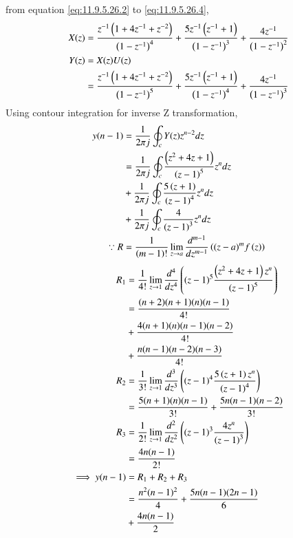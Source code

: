 \documentclass[journal,12pt,twocolumn]{IEEEtran}
\theoremstyle{remark}
\begin{document}
from equation \eqref{eq:11.9.5.26.2} to \eqref{eq:11.9.5.26.4},\\
    \begin{align}
        X(z) &= \frac{z^{-1}\left(1+4z^{-1}+z^{-2}\right)}{\left(1-z^{-1}\right)^4} + \frac{5z^{-1}\left(z^{-1}+1\right)}{\left(1-z^{-1}\right)^3} + \frac{4z^{-1}}{\left(1-z^{-1}\right)^2} \\
        Y(z) &= X(z)U(z)\\
        &= \frac{z^{-1}\left(1+4z^{-1}+z^{-2}\right)}{\left(1-z^{-1}\right)^5} + \frac{5z^{-1}\left(z^{-1}+1\right)}{\left(1-z^{-1}\right)^4} + \frac{4z^{-1}}{\left(1-z^{-1}\right)^3} 
    \end{align}
Using contour integration for inverse Z transformation,
    \begin{align}
        y(n-1) &= \frac{1}{2\pi j}\oint_c Y(z) z^{n-2} dz \\
        &= \frac{1}{2\pi j}\oint_c \frac{\left(z^2+4z+1\right)}{\left(z-1\right)^5} z^{n} dz  \nonumber\\
        &+ \frac{1}{2\pi j}\oint_c \frac{5\left(z+1\right)}{\left(z-1\right)^4} z^{n} dz   \nonumber\\
        &+ \frac{1}{2\pi j}\oint_c \frac{4}{\left(z-1\right)^3} z^{n} dz \\
        \because R&=\frac{1}{\left(m-1\right)!}\lim\limits_{z\to a}\frac{d^{m-1}}{dz^{m-1}}\left({(z-a)}^{m}f\left(z\right)\right)
    \end{align}
    \begin{align}
        R_1 &=\frac{1}{4!}\lim\limits_{z\to 1}\frac{d^4}{dz^4}\left((z-1)^5 \frac{\left(z^2+4z+1\right)z^n}{\left(z-1\right)^5}\right)\\
        &= \frac{(n+2)(n+1)(n)(n-1)}{4!} \nonumber\\
        & + \frac{4(n+1)(n)(n-1)(n-2)}{4!} \nonumber\\
        & + \frac{n(n-1)(n-2)(n-3)}{4!}\\
        R_2 &=\frac{1}{3!}\lim\limits_{z\to 1}\frac{d^3}{dz^3} \left((z-1)^4 \frac{5\left(z+1\right)z^n}{\left(z-1\right)^4}\right)\\
        &= \frac{5(n+1)(n)(n-1)}{3!} + \frac{5n(n-1)(n-2)}{3!}\\
        R_3 &=\frac{1}{2!}\lim\limits_{z\to 1}\frac{d^2}{dz^2} \left((z-1)^3 \frac{4z^n}{\left(z-1\right)^3}\right)\\
        &= \frac{4n(n-1)}{2!}\\
        \implies y(n-1) &= R_1 + R_2 + R_3 \\
        &= \frac{n^2(n-1)^2}{4} + \frac{5n(n-1)(2n-1)}{6} \nonumber\\
        &+ \frac{4n(n-1)}{2}
    \end{align}
\end{document}
